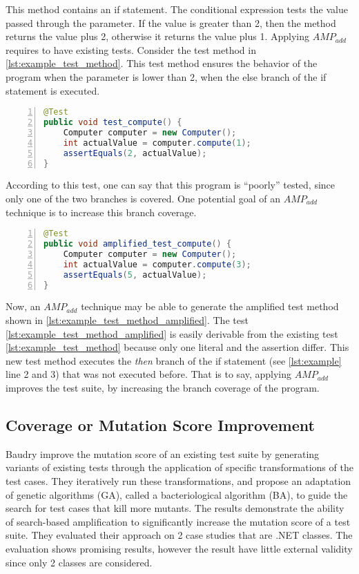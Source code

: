 This method contains an if statement. 
The conditional expression tests the value passed through the parameter. 
If the value is greater than 2, then the method returns the value plus 2, otherwise it returns the value plus 1.
Applying $AMP_{add}$ requires to have existing tests. 
Consider the test method in \autoref{lst:example_test_method}.
This test method ensures the behavior of the program when the parameter is lower than 2, \ie when the else branch of the if statement is executed.

\begin{lstlisting}[caption={Example of toy test method},label=lst:example_test_method,float,language=java,numbers=left] 
@Test
public void test_compute() {
	Computer computer = new Computer();
	int actualValue = computer.compute(1);
	assertEquals(2, actualValue);
}
\end{lstlisting}

According to this test, one can say that this program is ``poorly'' tested, since only one of the two branches is covered.
One potential goal of an $AMP_{add}$ technique is to increase this branch coverage. 

\begin{lstlisting}[caption={Example of amplified toy test method},label=lst:example_test_method_amplified,float,language=java,numbers=left] 
@Test
public void amplified_test_compute() {
	Computer computer = new Computer();
	int actualValue = computer.compute(3);
	assertEquals(5, actualValue);
}
\end{lstlisting}

Now, an $AMP_{add}$ technique may be able to generate the amplified test method shown in \autoref{lst:example_test_method_amplified}.
The test \autoref{lst:example_test_method_amplified} is easily derivable from the existing test \autoref{lst:example_test_method} because only one literal and the assertion differ.
This new test method executes the \textit{then} branch of the if statement (see \autoref{lst:example} line 2 and 3) that was not executed before. 
That is to say, applying $AMP_{add}$ improves the test suite, by increasing the branch coverage of the program.

\subsection{Coverage or Mutation Score Improvement}
\label{subsec:sota:category-1:coverage-vs-mutation}

Baudry \ie \cite{Baudry05a} \cite{Baudry05d} improve the mutation score of an existing test suite by generating variants of existing tests through the application of specific transformations of the test cases. 
They iteratively run these transformations, and propose an adaptation of genetic algorithms (GA), called a bacteriological algorithm (BA), to guide the search for test cases that kill more mutants.  
The results demonstrate the ability of search-based amplification to significantly increase the mutation score of a test suite.
They evaluated their approach on 2 case studies that are .NET classes.
The evaluation shows promising results, however the result have little external validity since only 2 classes are considered.

